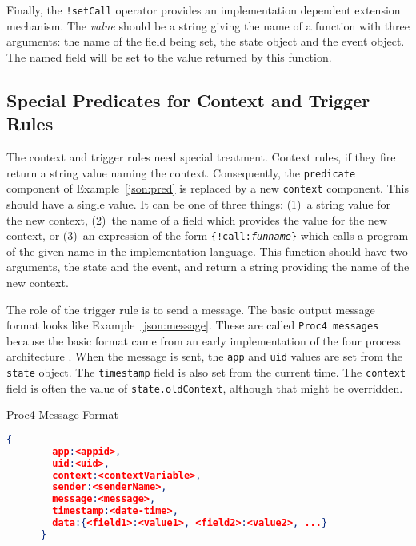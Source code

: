 \documentclass{article}
\begin{document}
  
  Finally, the \texttt{!setCall} operator provides an implementation
  dependent extension mechanism.  The \textit{value} should be a
  string giving the name of a function with three arguments:  the name
  of the field being set, the state object and the event object.  The
  named field will be set to the value returned by this function.

  \subsection{Special Predicates for Context and Trigger Rules}
  \label{sub:specRule}

  The context and trigger rules need special treatment.  Context
  rules, if they fire return a string value naming the context.
  Consequently, the \texttt{predicate} component of
  Example~\ref{json:pred} is replaced by a new \texttt{context}
  component.  This should have a single value.  It can be one of three
  things:  (1)~a string value for the new context, (2)~the name of a
  field which provides the value for the new context, or (3)~an
  expression of the form \texttt{\{!call:\textit{funname}\}} which
  calls a program of the given name in the implementation language.
  This function should have two arguments, the state and the event,
  and return a string providing the name of the new context.
  
  The role of the trigger rule is to send a message.  The basic output
  message format looks like Example~\ref{json:message}.  These are
  called \texttt{Proc4 messages} because the basic format came from an
  early implementation of the four process architecture \cite{Proc4}.
  When the message is sent, the \texttt{app} and \texttt{uid} values
  are set from the \texttt{state} object.  The \texttt{timestamp}
  field is also set from the current time.  The \texttt{context} field
  is often the value of \texttt{state.oldContext}, although that might
  be overridden.

  \begin{algorithm}
    \caption{Proc4 Message Format}
    \label{json:send}
    \begin{lstlisting}[language=json]
      {
        app:<appid>,
        uid:<uid>,
        context:<contextVariable>,
        sender:<senderName>,
        message:<message>,
        timestamp:<date-time>,
        data:{<field1>:<value1>, <field2>:<value2>, ...}
      }
    \end{lstlisting}
  \end{algorithm}
\end{document}
